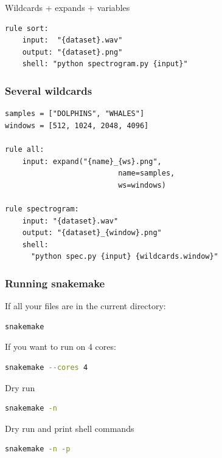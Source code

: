 \documentclass{beamer}
\begin{document}
\begin{frame}[fragile]
\begin{center}
\begin{minipage}{11cm}
\begin{onlyenv}
\begin{block}{Wildcards + expands + variables}
\begin{lstlisting}[basicstyle=\large]
rule sort:
    input:  "{dataset}.wav"
    output: "{dataset}.png"
    shell: "python spectrogram.py {input}"
           \end{lstlisting}     
  \end{block}
     \end{onlyenv}        
    \end{minipage}
 \end{center}
 
\end{frame}
        
      
\begin{frame}[fragile]
\frametitle{Several wildcards}
   \begin{minipage}{12cm}
  \begin{block}{}
            \begin{lstlisting}[basicstyle=\large]
samples = ["DOLPHINS", "WHALES"]
windows = [512, 1024, 2048, 4096]

rule all:
    input: expand("{name}_{ws}.png", 
                          name=samples, 
                          ws=windows)

rule spectrogram:
    input: "{dataset}.wav"
    output: "{dataset}_{window}.png"
    shell: 
      "python spec.py {input} {wildcards.window}"
            \end{lstlisting}
  \end{block}
\end{minipage}
\end{frame}
  
        

\begin{frame}[fragile]
    \frametitle{Running snakemake}
      If all your files are in the current directory:
            \begin{lstlisting}[language=bash]
            snakemake
            \end{lstlisting}
      If you want to run on 4 cores:
            
            \begin{lstlisting}[language=bash]
            snakemake --cores 4
            \end{lstlisting}
      Dry run      
            \begin{lstlisting}[language=bash]            
            snakemake -n
            \end{lstlisting}
      Dry run and print shell commands
            
	  \begin{lstlisting}[language=bash]            
            snakemake -n -p
          \end{lstlisting}  
                
\end{frame}
\end{document}
